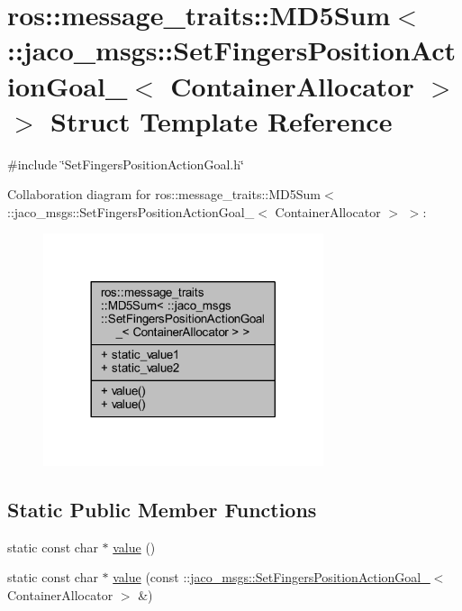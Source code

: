 \hypertarget{structros_1_1message__traits_1_1MD5Sum_3_01_1_1jaco__msgs_1_1SetFingersPositionActionGoal___3_01ContainerAllocator_01_4_01_4}{}\section{ros\+:\+:message\+\_\+traits\+:\+:M\+D5\+Sum$<$ \+:\+:jaco\+\_\+msgs\+:\+:Set\+Fingers\+Position\+Action\+Goal\+\_\+$<$ Container\+Allocator $>$ $>$ Struct Template Reference}
\label{structros_1_1message__traits_1_1MD5Sum_3_01_1_1jaco__msgs_1_1SetFingersPositionActionGoal___3_01ContainerAllocator_01_4_01_4}


{\ttfamily \#include \char`\"{}Set\+Fingers\+Position\+Action\+Goal.\+h\char`\"{}}



Collaboration diagram for ros\+:\+:message\+\_\+traits\+:\+:M\+D5\+Sum$<$ \+:\+:jaco\+\_\+msgs\+:\+:Set\+Fingers\+Position\+Action\+Goal\+\_\+$<$ Container\+Allocator $>$ $>$\+:
\nopagebreak
\begin{figure}[H]
\begin{center}
\leavevmode
\includegraphics[width=233pt]{df/d65/structros_1_1message__traits_1_1MD5Sum_3_01_1_1jaco__msgs_1_1SetFingersPositionActionGoal___3_01db2ab788ffb00734cd979a670d5bb16b}
\end{center}
\end{figure}
\subsection*{Static Public Member Functions}
\begin{DoxyCompactItemize}
\item 
static const char $\ast$ \hyperlink{structros_1_1message__traits_1_1MD5Sum_3_01_1_1jaco__msgs_1_1SetFingersPositionActionGoal___3_01ContainerAllocator_01_4_01_4_a81ca1020f136090c46f1e5a4ce919090}{value} ()
\item 
static const char $\ast$ \hyperlink{structros_1_1message__traits_1_1MD5Sum_3_01_1_1jaco__msgs_1_1SetFingersPositionActionGoal___3_01ContainerAllocator_01_4_01_4_ad47b817dbd61246f9a3cf49b8add2264}{value} (const \+::\hyperlink{structjaco__msgs_1_1SetFingersPositionActionGoal__}{jaco\+\_\+msgs\+::\+Set\+Fingers\+Position\+Action\+Goal\+\_\+}$<$ Container\+Allocator $>$ \&)
\end{DoxyCompactItemize}
